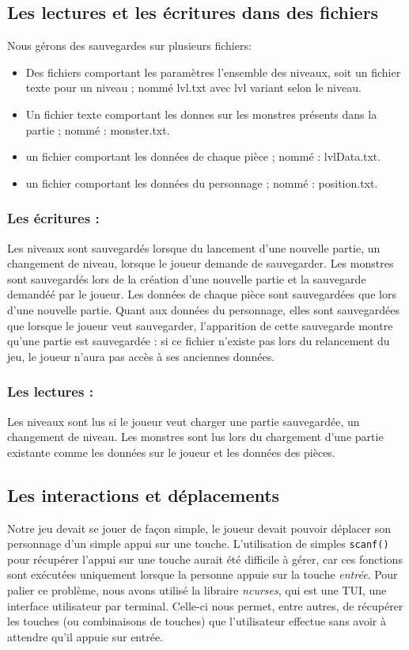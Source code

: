 \documentclass[11pt]{report}
\begin{document}
		\subsection{Les lectures et les écritures dans des fichiers}
		
		Nous gérons des sauvegardes sur plusieurs fichiers:
		\begin{itemize}
			\item Des fichiers comportant les paramètres l'ensemble des niveaux, soit un fichier texte pour un niveau ; nommé lvl.txt avec lvl variant selon le niveau.
			\item Un fichier texte comportant les donnes sur les monstres présents dans la partie ; nommé : monster.txt.
			\item un fichier comportant les données de chaque pièce ; nommé : lvlData.txt.
			\item un fichier comportant les données du personnage ; nommé : position.txt.
		\end{itemize} 
		\subsubsection{Les écritures :}
		Les niveaux sont sauvegardés lorsque du lancement d'une nouvelle partie, un changement de niveau, lorsque le joueur demande de sauvegarder. Les monstres sont sauvegardés lors de la création d'une nouvelle partie et la sauvegarde demandéé par le joueur. Les données de chaque pièce sont sauvegardées que lors d'une nouvelle partie. Quant aux données du personnage, elles sont sauvegardées que lorsque le joueur veut sauvegarder, l'apparition de cette sauvegarde montre qu'une partie est sauvegardée : si ce fichier n'existe pas lors du relancement du jeu, le joueur n'aura pas accès à ses anciennes données.

		\subsubsection{Les lectures :}
		Les niveaux sont lus si le joueur veut charger une partie sauvegardée, un changement de niveau. Les monstres sont lus lors du chargement d'une partie existante comme les données sur le joueur et les données des pièces.

		\subsection{Les interactions et déplacements}\label{ncurses}

		
			Notre jeu devait se jouer de façon simple, le joueur devait pouvoir déplacer son personnage d'un simple appui sur une touche. L'utilisation de simples \texttt{scanf()} pour récupérer l'appui sur une touche aurait été difficile à gérer, car ces fonctions sont exécutées uniquement lorsque la personne appuie sur la touche \textit{entrée}. Pour palier ce problème, nous avons utilisé la libraire \emph{ncurses}, qui est une \textsc{TUI}, une interface utilisateur par terminal. Celle-ci nous permet, entre autres, de récupérer les touches (ou combinaisons de touches) que l'utilisateur effectue sans avoir à attendre qu'il appuie sur entrée.
			
\end{document}

